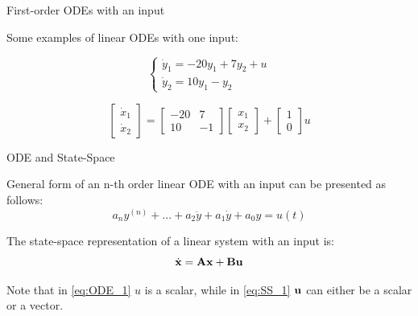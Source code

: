 \documentclass{beamer}
\begin{document}
\begin{frame}{First-order ODEs with an input}
	\begin{flushleft}
		
		Some examples of linear ODEs with one input:
		
		
		\begin{example}
			\begin{equation}
				\begin{cases}
					\dot{y}_1 = -20 y_1 + 7 y_2 + u \\
					\dot{y}_2 = 10 y_1 - y_2
				\end{cases}
			\end{equation}
		\end{example}
		
		\begin{example}
			\begin{equation}
				\begin{bmatrix}
					\dot{x}_1 \\
					\dot{x}_2
				\end{bmatrix} 
				= 
				\begin{bmatrix}
					-20  & 7 \\
					10 & -1
				\end{bmatrix}
				\begin{bmatrix}
					x_1 \\
					x_2 
				\end{bmatrix} 
			+
			\begin{bmatrix}
				1    \\
				0  
			\end{bmatrix}
			u
			\end{equation}
		\end{example}
		
	\end{flushleft}
\end{frame}



\begin{frame}{ODE and State-Space}
	\begin{flushleft}
		
		General form of an n-th order linear ODE with an input can be presented as follows:
		\begin{equation}
			\label{eq:ODE_1}
			a_n y^{(n)} + 
			... +
			a_2 \ddot{y} + a_1 \dot{y} + 
			a_0 y = u(t)
		\end{equation}
	
	\bigskip
		
		The state-space representation of a linear system with an input is:
		\begin{equation}
			\label{eq:SS_1}
			\dot{\mathbf{x}} = \mathbf{A} \mathbf{x} + \mathbf{B} \mathbf{u}
		\end{equation}
		
		Note that in \eqref{eq:ODE_1} $u$ is a scalar, while in \eqref{eq:SS_1} $\mathbf{u}$ can either be a scalar or a vector.
		
	\end{flushleft}
\end{frame}
\end{document}
